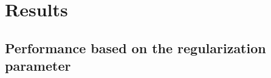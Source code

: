 
\section{Results}


\subsection{Performance based on the regularization parameter}
\label{sec:regpath}

